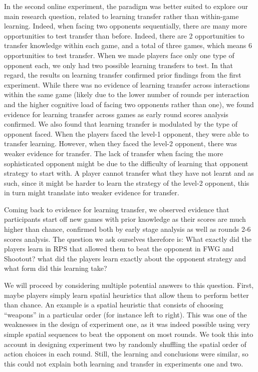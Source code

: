 \documentclass[man,floatsintext]{apa6}
\begin{document}
In the second online experiment, the paradigm was better suited to explore our main research question, related to learning transfer rather than within-game learning. Indeed, when facing two opponents sequentially, there are many more opportunities to test transfer than before. Indeed, there are 2 opportunities to transfer knowledge within each game, and a total of three games, which means 6 opportunities to test transfer. When we made players face only one type of opponent each, we only had two possible learning transfers to test. In that regard, the results on learning transfer confirmed prior findings from the first experiment. While there was no evidence of learning transfer across interactions within the same game (likely due to the lower number of rounds per interaction and the higher cognitive load of facing two opponents rather than one), we found evidence for learning transfer across games as early round scores analysis confirmed. We also found that learning transfer is modulated by the type of opponent faced. When the players faced the level-1 opponent, they were able to transfer learning. However, when they faced the level-2 opponent, there was weaker evidence for transfer. The lack of transfer when facing the more sophisticated opponent might be due to the difficulty of learning that opponent strategy to start with. A player cannot transfer what they have not learnt and as such, since it might be harder to learn the strategy of the level-2 opponent, this in turn might translate into weaker evidence for transfer.

Coming back to evidence for learning transfer, we observed evidence that participants start off new games with prior knowledge as their scores are much higher than chance, confirmed both by early stage analysis as well as rounds 2-6 scores analysis. The question we ask ourselves therefore is: What exactly did the players learn in RPS that allowed them to beat the opponent in FWG and Shootout? what did the players learn exactly about the opponent strategy and what form did this learning take?

We will proceed by considering multiple potential answers to this question. First, maybe players simply learn spatial heuristics that allow them to perform better than chance. An example is a spatial heuristic that consists of choosing ``weapons'' in a particular order (for instance left to right). This was one of the weaknesses in the design of experiment one, as it was indeed possible using very simple spatial sequences to beat the opponent on most rounds. We took this into account in designing experiment two by randomly shuffling the spatial order of action choices in each round. Still, the learning and conclusions were similar, so this could not explain both learning and transfer in experiments one and two.
\end{document}
